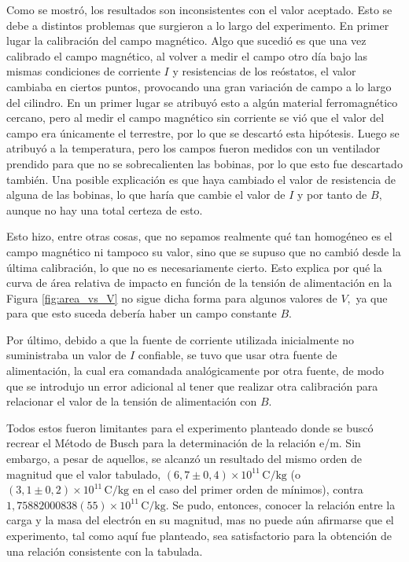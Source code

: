 Como se mostró, los resultados son inconsistentes con el valor aceptado. Esto se debe a distintos problemas
que surgieron a lo largo del experimento. En primer lugar la calibración del campo magnético.
Algo que sucedió es que una vez calibrado el campo magnético, al volver a medir el campo otro día bajo
las mismas condiciones de corriente $I$ y resistencias de los reóstatos, el valor cambiaba en ciertos puntos, provocando una gran variación de campo a lo largo del cilindro. En un primer
lugar se atribuyó esto a algún material ferromagnético cercano, pero al medir el campo magnético sin corriente se vió
que el valor del campo era únicamente el terrestre, por lo que se descartó esta hipótesis. Luego se atribuyó a la temperatura,
pero los campos fueron medidos con un ventilador prendido para que no se sobrecalienten las bobinas, por lo que esto fue descartado también.
Una posible explicación es que haya cambiado el valor de resistencia de alguna de las bobinas, lo que haría que cambie el
valor de $I$ y por tanto de $B,$ aunque no hay una total certeza de esto.

Esto hizo, entre otras cosas, que no sepamos realmente qué tan homogéneo es el campo magnético ni tampoco su valor, sino que se supuso que no cambió
desde la última calibración, lo que no es necesariamente cierto. Esto explica por qué la curva de área relativa de impacto en función
de la tensión de alimentación en la Figura \ref{fig:area_vs_V} no sigue dicha forma para algunos valores de $V,$ ya que para que esto suceda debería haber un
campo constante $B.$

Por último, debido a que la fuente de corriente utilizada inicialmente no suministraba un valor de $I$ confiable,
se tuvo que usar otra fuente de alimentación, la cual era comandada analógicamente por otra fuente, de modo que se introdujo un error adicional al tener que
realizar otra calibración para relacionar el valor de la tensión de alimentación con $B.$

Todos estos fueron limitantes para el experimento planteado donde se buscó recrear el Método de Busch para la determinación de la relación e/m.
Sin embargo, a pesar de aquellos, se alcanzó un resultado del mismo orden de magnitud que el valor tabulado, $\left( 6,7 \pm 0,4 \right)\times 10^{11}\,\unit{\coulomb\per\kilogram}$ (o $\left( 3,1 \pm 0,2 \right)\times 10^{11}\,\unit{\coulomb\per\kilogram}$ en el caso del primer orden de mínimos), 
contra $1,75882000838(55)\times 10^{11}\,\unit{\coulomb\per\kilogram}$. Se pudo, entonces, conocer la relación entre la carga y la masa del electrón en su magnitud,
mas no puede aún afirmarse que el experimento, tal como aquí fue planteado, sea satisfactorio para la obtención de una relación consistente con la tabulada.